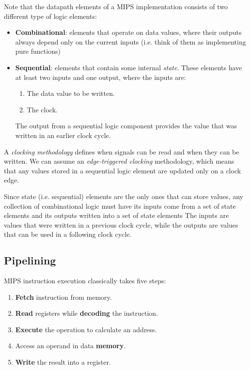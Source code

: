 \documentclass[10pt,a4paper]{article}
\begin{document}
Note that the datapath elements of a MIPS implementation consists of two different type of logic elements:
\begin{itemize}
    \item \textbf{Combinational}: elements that operate on data values, where their outputs always depend only on the current inputs (i.e. think of them as implementing pure functions)
    \item \textbf{Sequential}: elements that contain some internal \textit{state}. These elements have at least two inputs and one output, where the inputs are:
    \begin{enumerate}
        \item The data value to be written.
        \item The clock.
    \end{enumerate}
    The output from a sequential logic component provides the value that was written in an earlier clock cycle.
\end{itemize}
A \textit{clocking methodology} defines when signals can be read and when they can be written. We can assume an \textit{edge-triggered clocking} methodology, which means that any values stored in a sequential logic element are updated only on a clock edge. 

Since state (i.e. sequential) elements are the only ones that can store values, any collection of combinational logic must have its inputs come from a set of state elements and its outputs written into a set of state elements The inputs are values that were written in a previous clock cycle, while the outputs are values that can be used in a following clock cycle.

\subsection{Pipelining}

MIPS instruction execution classically takes five steps:
\begin{enumerate}
    \item \textbf{Fetch} instruction from memory.
    \item \textbf{Read} registers while \textbf{decoding} the instruction.
    \item \textbf{Execute} the operation to calculate an address.
    \item Access an operand in data \textbf{memory}.
    \item \textbf{Write} the result into a register.
\end{enumerate}
\end{document}
